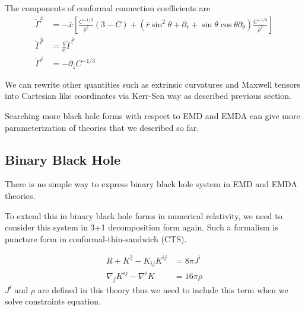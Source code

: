 \documentclass[prd]{revtex4}
\begin{document}
The components of conformal connection coefficients are
\begin{align}
\tilde{\Gamma}^{\bar{x}} &= -\bar{x} \left[\frac{C^{-1/3}}{\bar{\rho}^2}(3-C) + (\bar{r} \sin^2 \theta + \partial_{\bar{r}} + \sin \theta \cos \theta \partial_\theta)\frac{C^{-1/3}}{\bar{\rho}^2} \right] \\
\tilde{\Gamma}^{\bar{y}} &= \frac{\bar{y}}{\bar{x}} \tilde{\Gamma}^{\bar{x}} \\
\tilde{\Gamma}^{\bar{z}} &= - \partial_{\bar{z}} C^{-1/3}
\end{align}


We can rewrite other quantities such as extrinsic curvatures and Maxwell tensors into Cartesian like coordinates via Kerr-Sen way as described previous section.



Searching more black hole forms with respect to EMD and EMDA can give more parameterization of theories that we described so far.

\subsection{Binary Black Hole}
There is no simple way to express binary black hole system in EMD and EMDA theories.

To extend this in binary black hole forms in numerical relativity, we need to consider this system in 3+1 decomposition form again. Such a formalism is puncture form in conformal-thin-sandwich (CTS).

\begin{align}
R + K^2 - K_{ij} K^{ij} &= 8 \pi J^i \\
\nabla_j K^{ij} - \nabla^i K &= 16 \pi \rho 
\end{align}
$J^i$ and $\rho$ are defined in this theory thus we need to include this term when we solve constraints equation.
\end{document}
